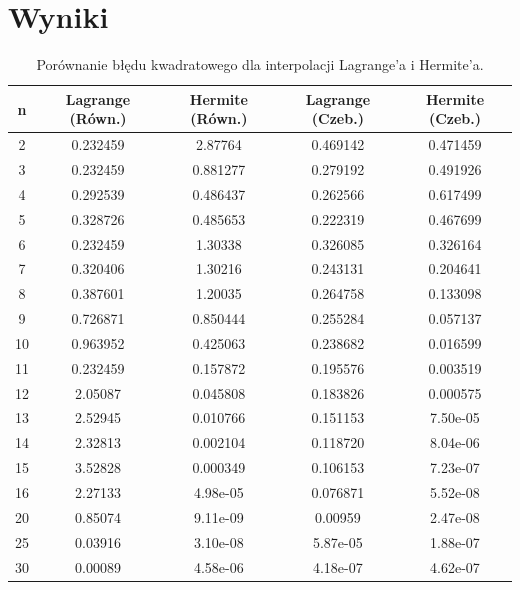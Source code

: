 \documentclass{article}
\begin{document}
\section{Wyniki}
\begin{table}[htbp]
\centering
\caption{Porównanie błędu kwadratowego dla interpolacji Lagrange'a i Hermite'a.}
\label{tab:mse_comparison}
\begin{tabular}{@{}ccccc@{}}
\toprule
\textbf{n} & \textbf{Lagrange (Równ.)} & \textbf{Hermite (Równ.)} & \textbf{Lagrange (Czeb.)} & \textbf{Hermite (Czeb.)} \\ \midrule
2  & 0.232459 & 2.87764   & 0.469142 & 0.471459 \\
3  & 0.232459 & 0.881277  & 0.279192 & 0.491926 \\
4  & 0.292539 & 0.486437  & 0.262566 & 0.617499 \\
5  & 0.328726 & 0.485653  & 0.222319 & 0.467699 \\
6  & 0.232459 & 1.30338   & 0.326085 & 0.326164 \\
7  & 0.320406 & 1.30216   & 0.243131 & 0.204641 \\
8  & 0.387601 & 1.20035   & 0.264758 & 0.133098 \\
9  & 0.726871 & 0.850444  & 0.255284 & 0.057137 \\
10 & 0.963952 & 0.425063  & 0.238682 & 0.016599 \\
11 & 0.232459 & 0.157872  & 0.195576 & 0.003519 \\
12 & 2.05087  & 0.045808  & 0.183826 & 0.000575 \\
13 & 2.52945  & 0.010766  & 0.151153 & 7.50e-05 \\
14 & 2.32813  & 0.002104  & 0.118720 & 8.04e-06 \\
15 & 3.52828  & 0.000349  & 0.106153 & 7.23e-07 \\
16 & 2.27133  & 4.98e-05  & 0.076871 & 5.52e-08 \\ \bottomrule
20 & 0.85074  & 9.11e-09  & 0.00959  & 2.47e-08 \\
25 & 0.03916  & 3.10e-08  & 5.87e-05 & 1.88e-07 \\
30 & 0.00089  & 4.58e-06  & 4.18e-07 & 4.62e-07 \\ \bottomrule
\end{tabular}
\end{table}
\end{document}
